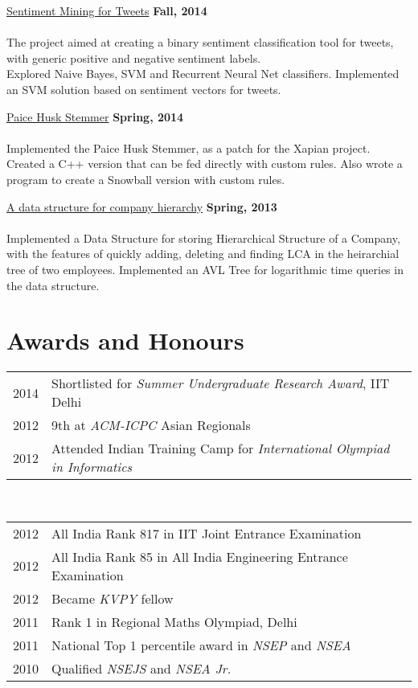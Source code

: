 \documentclass[margin,line]{res}
\begin{document}
\begin{resume}
\underline{\sc Sentiment Mining for Tweets} \hfill {\bf Fall, 2014}\\\\
The project aimed at creating a binary sentiment classification tool for tweets, with generic positive and negative sentiment labels. \\Explored Naive Bayes, SVM and Recurrent Neural Net classifiers. Implemented an SVM solution based on sentiment vectors for tweets.

\underline{\sc Paice Husk Stemmer} \hfill {\bf Spring, 2014}\\\\
Implemented the Paice Husk Stemmer, as a patch for the Xapian project. Created a C++ version that can be fed directly with custom rules. Also wrote a program to create a Snowball version with custom rules.

\underline{\sc A data structure for company hierarchy} \hfill {\bf Spring, 2013}\\\\
Implemented a Data Structure for storing Hierarchical Structure of a Company, with the features of quickly adding, deleting and finding LCA in the heirarchial tree of two employees. Implemented an AVL Tree for logarithmic time queries in the data structure.

\section{\sc Awards and Honours}

\begin{tabular}{rl}
2014 & Shortlisted for {\em Summer Undergraduate Research Award}, IIT Delhi\\
2012 & 9th at {\em ACM-ICPC} Asian Regionals\\
2012 & Attended Indian Training Camp for {\em International Olympiad in Informatics}\\
\end{tabular}\\
\begin{tabular}{rl}
2012 & All India Rank 817 in IIT Joint Entrance Examination\\
2012 & All India Rank 85 in All India Engineering Entrance Examination\\
2012 & Became {\em KVPY} fellow\\
2011 & Rank 1 in Regional Maths Olympiad, Delhi\\
2011 & National Top 1 percentile award in {\em NSEP} and {\em NSEA}\\
2010 & Qualified {\em NSEJS} and {\em NSEA Jr.}\\
\end{tabular}


\end{resume}
\end{document}
